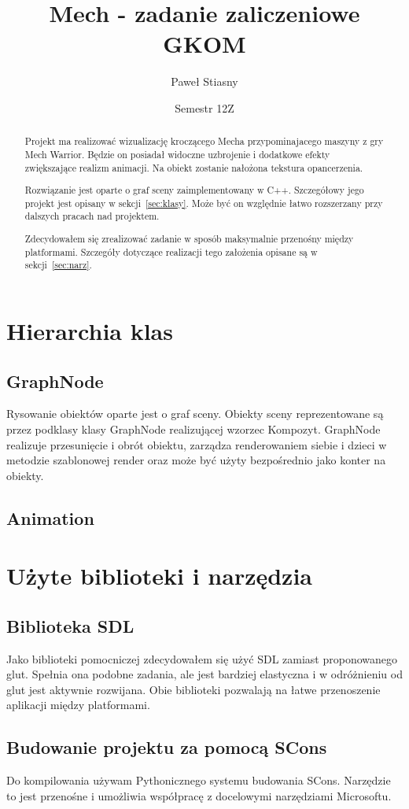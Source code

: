 \documentclass[12pt,a4paper]{article}
\title{Mech - zadanie zaliczeniowe GKOM}
\author{Paweł Stiasny}
\date{Semestr 12Z}
\begin{document}
\begin{titlepage}
\maketitle

\begin{abstract}
Projekt ma realizować wizualizację kroczącego Mecha przypominajacego maszyny z
gry Mech Warrior.  Będzie on posiadał widoczne uzbrojenie i dodatkowe efekty
zwiększające realizm animacji.  Na obiekt zostanie nałożona tekstura
opancerzenia.

Rozwiązanie jest oparte o graf sceny zaimplementowany w C++.  Szczegółowy jego
projekt jest opisany w sekcji~\ref{sec:klasy}.  Może być on względnie łatwo
rozszerzany przy dalszych pracach nad projektem.

Zdecydowałem się zrealizować zadanie w sposób maksymalnie przenośny między
platformami.  Szczegóły dotyczące realizacji tego założenia opisane są w
sekcji~\ref{sec:narz}.
\end{abstract}
\end{titlepage}

\section{Hierarchia klas}
\label{sec:klasy}
\subsection{GraphNode}
Rysowanie obiektów oparte jest o graf sceny.  Obiekty sceny reprezentowane są
przez podklasy klasy GraphNode realizującej wzorzec Kompozyt.  GraphNode
realizuje przesunięcie i obrót obiektu, zarządza renderowaniem siebie i dzieci w
metodzie szablonowej render oraz może być użyty bezpośrednio jako konter na
obiekty.

\subsection{Animation}

\section{Użyte biblioteki i narzędzia}
\label{sec:narz}
\subsection{Biblioteka SDL}
Jako biblioteki pomocniczej zdecydowałem się użyć SDL zamiast proponowanego
glut.  Spełnia ona podobne zadania, ale jest bardziej elastyczna i w odróżnieniu
od glut jest aktywnie rozwijana.  Obie biblioteki pozwalają na łatwe
przenoszenie aplikacji między platformami.

\subsection{Budowanie projektu za pomocą SCons}
Do kompilowania używam Pythonicznego systemu budowania SCons.  Narzędzie to jest
przenośne i umożliwia współpracę z docelowymi narzędziami Microsoftu.
\end{document}
